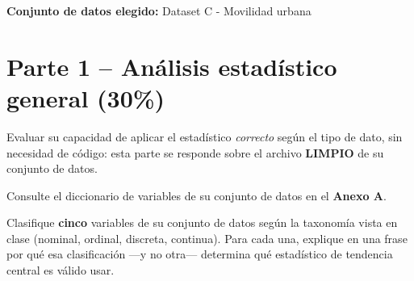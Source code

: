 \documentclass[11pt]{article}
\begin{document}
\noindent\textbf{Conjunto de datos elegido:} Dataset C - Movilidad urbana

\section{Parte 1 -- Análisis estadístico general (30\%)}
\begin{contexto}
Evaluar su capacidad de aplicar el estadístico \emph{correcto} según el tipo de dato, sin necesidad de código: esta parte se responde sobre el archivo \textbf{LIMPIO} de su conjunto de datos.
\end{contexto}

\noindent Consulte el diccionario de variables de su conjunto de datos en el \textbf{Anexo A}.

\begin{pregunta}
Clasifique \textbf{cinco} variables de su conjunto de datos según la taxonomía vista en clase (nominal, ordinal, discreta, continua). Para cada una, explique en una frase por qué esa clasificación —y no otra— determina qué estadístico de tendencia central es válido usar.
\end{pregunta}
\end{document}
